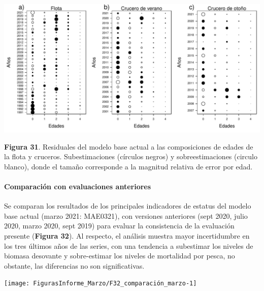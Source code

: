 \documentclass[
  spanish,
]{article}
\begin{document}
\begin{center}\includegraphics{FigurasInforme_Marzo/Fig31_resComp-1} \end{center}

\vspace{-0.5cm}
\small

\textbf{Figura 31}. Residuales del modelo base actual a las
composiciones de edades de la flota y cruceros. Subestimaciones
(círculos negros) y sobreestimaciones (circulo blanco), donde el tamaño
corresponde a la magnitud relativa de error por edad. \vspace{0.3cm}
\normalsize

\pagebreak

\hypertarget{comparaciuxf3n-con-evaluaciones-anteriores-1}{%
\paragraph{Comparación con evaluaciones
anteriores}\label{comparaciuxf3n-con-evaluaciones-anteriores-1}}

\quad

Se comparan los resultados de los principales indicadores de estatus del
modelo base actual (marzo 2021: MAE0321), con versiones anteriores (sept
2020, julio 2020, marzo 2020, sept 2019) para evaluar la consistencia de
la evaluación presente (\textbf{Figura 32}). Al respecto, el análisis
muestra mayor incertidumbre en los tres últimos años de las series, con
una tendencia a subestimar los niveles de biomasa desovante y
sobre-estimar los niveles de mortalidad por pesca, no obstante, las
diferencias no son significativas.

\begin{center}\texttt{[image: FigurasInforme\_Marzo/F32\_comparación\_marzo-1]} \end{center}

\small
\end{document}

